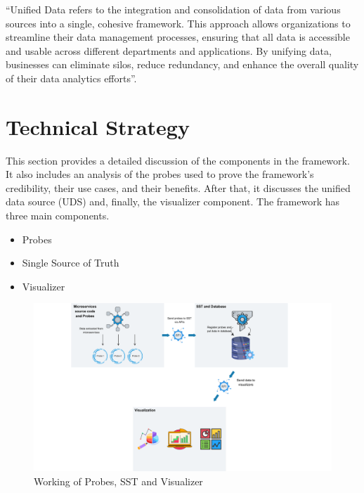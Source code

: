 \begin{tcolorbox}[colback=gray!10, colframe=gray!20]
	``Unified Data refers to the integration and consolidation of data from various sources into a single, cohesive framework. This approach allows organizations to streamline their data management processes, ensuring that all data is accessible and usable across different departments and applications. By unifying data, businesses can eliminate silos, reduce redundancy, and enhance the overall quality of their data analytics efforts''.~\citep{unifiedData2025}
\end{tcolorbox}

\section{Technical Strategy}\label{sec:tech-strategy}

This section provides a detailed discussion of the components in the framework. It also includes an analysis of the probes used to prove the framework's credibility, their use cases, and their benefits. After that, it discusses the unified data source (UDS) and, finally, the visualizer component. The framework has three main components.
\begin{itemize}
    \item Probes
    \item Single Source of Truth
    \item Visualizer
\end{itemize}

\begin{figure}[H]
    \centering
    \includegraphics[width=1\textwidth]{figures/vision.png}
    \caption[Framework working]{Working of Probes, SST and Visualizer}
	\label{fig_vision}
\end{figure}

